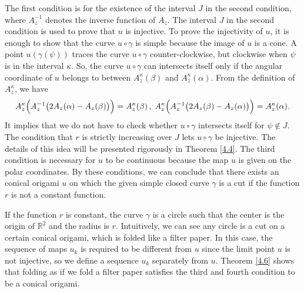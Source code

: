 \documentclass{amsart}
\theoremstyle{plain}
\theoremstyle{definition}
\theoremstyle{remark}
\begin{document}
The first condition is for the existence of the interval $J$ in the second condition, where $A_z^{-1}$ denotes the inverse function of $A_z$.
The interval $J$ in the second condition is used to prove that $u$ is injective.
To prove the injectivity of $u$, it is enough to show that the curve $u\circ\gamma$ is simple because the image of $u$ is a cone.
A point $u(\gamma(\psi))$ traces the curve $u\circ\gamma$ counter-clockwise, but clockwise when $\psi$ is in the interval $\kappa$.
So, the curve $u\circ\gamma$ can intersects itself only if the angular coordinate of $u$ belongs to between $A_z^{\kappa}(\beta)$ and $A_z^{\kappa}(\alpha)$.
From the definition of $A_z^{\kappa}$, we have
\begin{align*}
A_z^{\kappa}\Bigl(A_z^{-1}\bigl(2A_z(\alpha)-A_z(\beta)\bigr)\Bigr)=A_z^{\kappa}(\beta)\,,\; A_z^{\kappa}\Bigl(A_z^{-1}\bigl(2A_z(\beta)-A_z(\alpha)\bigr)\Bigr)=A_z^{\kappa}(\alpha).
\end{align*}
It implies that we do not have to check whether $u\circ\gamma$ intersects itself for $\psi\notin J$.
The condition that $r$ is strictly increasing over $J$ lets $u\circ\gamma$ be injective.
The details of this idea will be presented rigorously in Theorem \ref{4.4}.
The third condition is necessary for $u$ to be continuous because the map $u$ is given on the polar coordinates.
By these conditions, we can conclude that there exists an conical origami $u$ on which the given simple closed curve $\gamma$ is a cut if the function $r$ is not a constant function.

If the function $r$ is constant, the curve $\gamma$ is a circle such that the center is the origin of $\mathbb{R}^2$ and the radius is $r$.
Intuitively, we can see any circle is a cut on a certain conical origami, which is folded like a filter paper.
In this case, the sequence of maps $u_k$ is required to be different from $u$ since the limit point $u$ is not injective, so we define a sequence $u_k$ separately from $u$.
Theorem \ref{4.6} shows that folding as if we fold a filter paper satisfies the third and fourth condition to be a conical origami.
\end{document}
